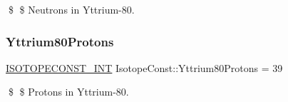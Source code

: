 \$ \$ Neutrons in Yttrium-\/80. \mbox{\label{group___isotope_const-_yttrium-_y80_ga3763ab366b49087d4174b68f8b874260}} 
\subsubsection{\texorpdfstring{Yttrium80\+Protons}{Yttrium80Protons}}
{\footnotesize\ttfamily \mbox{\hyperlink{group___isotope_const-_macros_ga5f18360b3e99483a35c32d789e62621c}{I\+S\+O\+T\+O\+P\+E\+C\+O\+N\+S\+T\+\_\+\+I\+NT}} Isotope\+Const\+::\+Yttrium80\+Protons = 39}

\$ \$ Protons in Yttrium-\/80. 